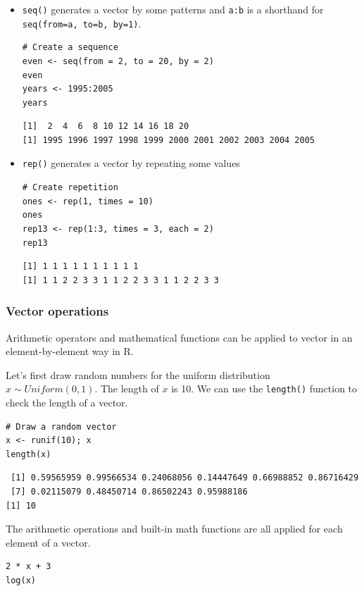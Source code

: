 \documentclass[a4paper,11pt]{article}
\begin{document}
\begin{itemize}
\item \texttt{seq()} generates a vector by some patterns and \texttt{a:b} is a shorthand
for \texttt{seq(from=a, to=b, by=1)}.

\begin{verbatim}
# Create a sequence
even <- seq(from = 2, to = 20, by = 2)
even
years <- 1995:2005
years
\end{verbatim}

\begin{verbatim}
[1]  2  4  6  8 10 12 14 16 18 20
[1] 1995 1996 1997 1998 1999 2000 2001 2002 2003 2004 2005
\end{verbatim}

\item \texttt{rep()} generates a vector by repeating some values

\begin{verbatim}
# Create repetition
ones <- rep(1, times = 10)
ones
rep13 <- rep(1:3, times = 3, each = 2)
rep13
\end{verbatim}

\begin{verbatim}
[1] 1 1 1 1 1 1 1 1 1 1
[1] 1 1 2 2 3 3 1 1 2 2 3 3 1 1 2 2 3 3
\end{verbatim}
\end{itemize}

\subsubsection*{Vector operations}
\label{sec:org93ab4ee}

Arithmetic operators and mathematical functions can be applied to
vector in an element-by-element way in R.

Let's first draw random numbers for the uniform distribution
\(x \sim Uniform(0, 1)\). The length of \(x\) is 10. We can use the
\texttt{length()} function to check the length of a vector.

\begin{verbatim}
# Draw a random vector
x <- runif(10); x
length(x)
\end{verbatim}

\begin{verbatim}
 [1] 0.59565959 0.99566534 0.24068056 0.14447649 0.66988852 0.86716429
 [7] 0.02115079 0.48450714 0.86502243 0.95988186
[1] 10
\end{verbatim}

The arithmetic operations and built-in math functions are all applied
for each element of a vector.
\begin{verbatim}
2 * x + 3
log(x)
\end{verbatim}
\end{document}
